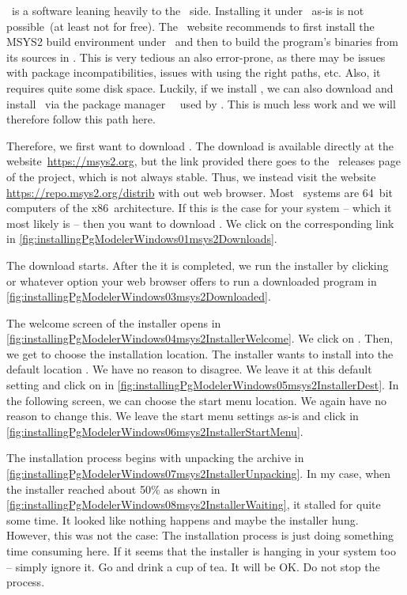 %
\pgmodeler\ is a software leaning heavily to the \linux\ side.
Installing it under \microsoftWindows\ as-is is not possible~(at least not for free).
The \pgmodeler\ website recommends to first install the \gls{MSYS2} build environment under \microsoftWindows\ and then to build the program's binaries from its sources in .
This is very tedious an also error-prone, as there may be issues with package incompatibilities, issues with using the right paths, etc.
Also, it requires quite some disk space.
Luckily, if we install , we can also download and install \pgmodeler\ via the package manager~~\cite{VGL2002:P,TOSID2025L:COMPMS} used by .
This is much less work and we will therefore follow this path here.

Therefore, we first want to download .
The download is available directly at the website~\url{https://msys2.org}, but the link provided there goes to the \github\ releases page of the project, which is not always stable.
Thus, we instead visit the website \url{https://repo.msys2.org/distrib} with out web browser.
Most \microsoftWindows\ systems are 64~bit computers of the x86~architecture.
If this is the case for your system -- which it most likely is -- then you want to download .
We click on the corresponding link in \cref{fig:installingPgModelerWindows01msys2Downloads}.

The download starts.
After the it is completed, we run the installer by clicking~ or whatever option your web browser offers to run a downloaded program in \cref{fig:installingPgModelerWindows03msys2Downloaded}.

The welcome screen of the installer opens in \cref{fig:installingPgModelerWindows04msys2InstallerWelcome}.
We click on .
Then, we get to choose the installation location.
The installer wants to install  into the default location \expandafter{}.
We have no reason to disagree.
We leave it at this default setting and click on  in \cref{fig:installingPgModelerWindows05msys2InstallerDest}.
In the following screen, we can choose the start menu location.
We again have no reason to change this.
We leave the start menu settings as-is and click  in \cref{fig:installingPgModelerWindows06msys2InstallerStartMenu}.

The installation process begins with unpacking the archive in \cref{fig:installingPgModelerWindows07msys2InstallerUnpacking}.
In my case, when the installer reached about 50\% as shown in \cref{fig:installingPgModelerWindows08msys2InstallerWaiting}, it stalled for quite some time.
It looked like nothing happens and maybe the installer hung.
However, this was not the case:
The installation process is just doing something time consuming here.
If it seems that the installer is hanging in your system too -- simply ignore it.
Go and drink a cup of tea.
It will be OK.
Do not stop the process.

